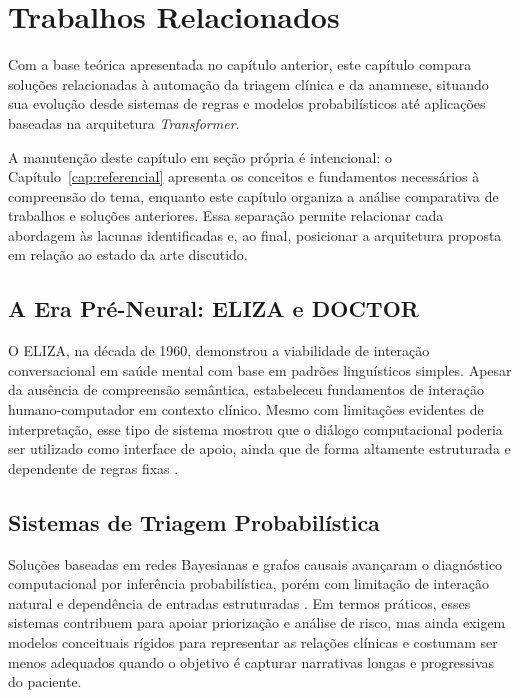 \chapter{Trabalhos Relacionados}
\label{cap:trabalhos}

Com a base teórica apresentada no capítulo anterior, este capítulo compara soluções relacionadas
à automação da triagem clínica e da anamnese, situando sua evolução desde sistemas de regras e
modelos probabilísticos até aplicações baseadas na arquitetura \textit{Transformer}.

A manutenção deste capítulo em seção própria é intencional: o Capítulo~\ref{cap:referencial}
apresenta os conceitos e fundamentos necessários à compreensão do tema, enquanto este capítulo
organiza a análise comparativa de trabalhos e soluções anteriores. Essa separação permite
relacionar cada abordagem às lacunas identificadas e, ao final, posicionar a arquitetura proposta
em relação ao estado da arte discutido.

\section{A Era Pré-Neural: ELIZA e DOCTOR}

O ELIZA, na década de 1960, demonstrou a viabilidade de interação conversacional em saúde
mental com base em padrões linguísticos simples. Apesar da ausência de compreensão
semântica, estabeleceu fundamentos de interação humano-computador em contexto clínico.
Mesmo com limitações evidentes de interpretação, esse tipo de sistema mostrou que o diálogo
computacional poderia ser utilizado como interface de apoio, ainda que de forma altamente
estruturada e dependente de regras fixas \cite{weizenbaum1966}.

\section{Sistemas de Triagem Probabilística}

Soluções baseadas em redes Bayesianas e grafos causais avançaram o diagnóstico computacional
por inferência probabilística, porém com limitação de interação natural e dependência de entradas
estruturadas \cite{richens2020}. Em termos práticos, esses sistemas contribuem para apoiar
priorização e análise de risco, mas ainda exigem modelos conceituais rígidos para representar
as relações clínicas e costumam ser menos adequados quando o objetivo é capturar narrativas
longas e progressivas do paciente.

